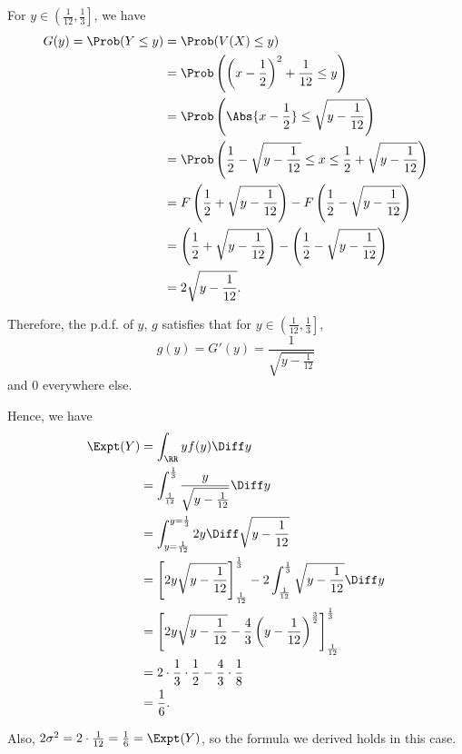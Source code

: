For \(y \in \left(\frac{1}{12}, \frac{1}{3}\right]\), we have
\begin{align*}
    G(y) = \Prob(Y \leq y) & = \Prob(V(X) \leq y)                                                                                        \\
                           & = \Prob\left(\left(x - \frac{1}{2}\right)^2 + \frac{1}{12} \leq y\right)                                    \\
                           & = \Prob\left(\Abs{x - \frac{1}{2}} \leq \sqrt{y - \frac{1}{12}}\right)                                      \\
                           & = \Prob\left(\frac{1}{2} - \sqrt{y - \frac{1}{12}} \leq x \leq \frac{1}{2} + \sqrt{y - \frac{1}{12}}\right) \\
                           & = F\left(\frac{1}{2} + \sqrt{y - \frac{1}{12}}\right) - F\left(\frac{1}{2} - \sqrt{y - \frac{1}{12}}\right) \\
                           & = \left(\frac{1}{2} + \sqrt{y - \frac{1}{12}}\right) - \left(\frac{1}{2} - \sqrt{y - \frac{1}{12}}\right)   \\
                           & = 2 \sqrt{y - \frac{1}{12}}.
\end{align*}

Therefore, the p.d.f. of \(y\), \(g\) satisfies that for \(y \in \left(\frac{1}{12}, \frac{1}{3}\right]\),
\[
    g(y) = G'(y) = \frac{1}{\sqrt{y - \frac{1}{12}}}
\]
and \(0\) everywhere else.

Hence, we have
\begin{align*}
    \Expt(Y) & = \int_{\RR} y f(y) \Diff y                                                                                                                \\
             & = \int_{\frac{1}{12}}^{\frac{1}{3}} \frac{y}{\sqrt{y - \frac{1}{12}}} \Diff y                                                              \\
             & = \int_{y = \frac{1}{12}}^{y = \frac{1}{3}} 2y \Diff \sqrt{y - \frac{1}{12}}                                                               \\
             & = \left[2y\sqrt{y - \frac{1}{12}}\right]_{\frac{1}{12}}^{\frac{1}{3}} - 2\int_{\frac{1}{12}}^{\frac{1}{3}} \sqrt{y - \frac{1}{12}} \Diff y \\
             & = \left[2y\sqrt{y - \frac{1}{12}} - \frac{4}{3} \left(y - \frac{1}{12}\right)^{\frac{3}{2}}\right]_{\frac{1}{12}}^{\frac{1}{3}}            \\
             & = 2 \cdot \frac{1}{3} \cdot \frac{1}{2} - \frac{4}{3} \cdot \frac{1}{8}                                                                    \\
             & = \frac{1}{6}.
\end{align*}

Also, \(2 \sigma^2 = 2 \cdot \frac{1}{12} = \frac{1}{6} = \Expt(Y)\), so the formula we derived holds in this case.